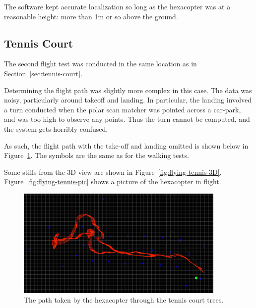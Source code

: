 \documentclass[12pt,oneside,a4paper]{book}
\begin{document}
The software kept accurate localization so long as the hexacopter was
at a reasonable height: more than 1m or so above the ground.

\newpage
\subsection{Tennis Court}
\label{sec:tennis-court-1}

The second flight test was conducted in the same location as in
Section~\ref{sec:tennis-court}. 

Determining the flight path was slightly more complex in this
case. The data was noisy, particularly around takeoff and landing. In
particular, the landing involved a turn conducted when the polar scan
matcher was pointed across a car-park, and was too high to observe any
points. Thus the turn cannot be computed, and the system gets horribly
confused.

As such, the flight path with the take-off and landing omitted is
shown below in Figure~\ref{fig:flying-tennis-path}. The symbols are
the same as for the walking tests.

Some stills from the 3D view are shown in
Figure~\ref{fig:flying-tennis-3D}. Figure~\ref{fig:flying-tennis-pic}
shows a picture of the hexacopter in flight.

\begin{figure}[h]
  \centering
  \includegraphics[width=0.9\textwidth]{figs/tennis-flying-results}
  \caption{The path taken by the hexacopter through the tennis court
    trees.}
  \label{fig:flying-tennis-path}
\end{figure}
\end{document}
